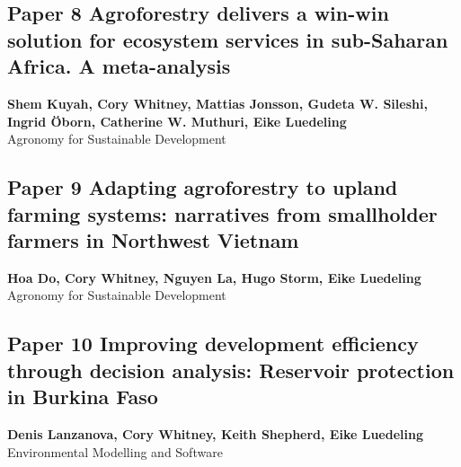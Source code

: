 \documentclass[
]{article}
\begin{document}
\newpage

\hypertarget{kuyah_agroforestry_2019}{%
\subsection{Paper 8 Agroforestry delivers a win-win solution for
ecosystem services in sub-Saharan Africa. A
meta-analysis}\label{kuyah_agroforestry_2019}}

\begin{center}
\vspace*{2cm}
{\Large \textbf{Shem Kuyah, Cory Whitney, Mattias Jonsson, Gudeta W. Sileshi, Ingrid Öborn, Catherine W. Muthuri, Eike Luedeling}} \\[0.5cm]
\vspace*{1cm}
{\Large Agronomy for Sustainable Development} \\[2cm]
\end{center}


\newpage

\hypertarget{do_adapting_2024}{%
\subsection{Paper 9 Adapting agroforestry to upland farming systems:
narratives from smallholder farmers in Northwest
Vietnam}\label{do_adapting_2024}}

\begin{center}
\vspace*{2cm}
{\Large \textbf{Hoa Do, Cory Whitney, Nguyen La, Hugo Storm, Eike Luedeling}} \\[0.5cm]
\vspace*{1cm}
{\Large Agronomy for Sustainable Development} \\[2cm]
\end{center}


\newpage

\hypertarget{lanzanova_improving_2019}{%
\subsection{Paper 10 Improving development efficiency through decision
analysis: Reservoir protection in Burkina
Faso}\label{lanzanova_improving_2019}}

\begin{center}
\vspace*{2cm}
{\Large \textbf{Denis Lanzanova, Cory Whitney, Keith Shepherd, Eike Luedeling}} \\[0.5cm]
\vspace*{1cm}
{\Large Environmental Modelling and Software} \\[2cm]
\end{center}

\end{document}
